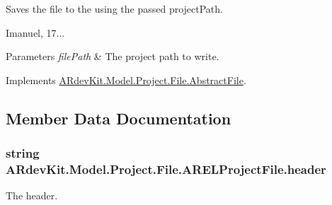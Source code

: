 Saves the file to the using the passed project\-Path. 

Imanuel, 17... 


\begin{DoxyParams}{Parameters}
{\em file\-Path} & The project path to write. \\
\hline
\end{DoxyParams}


Implements \hyperlink{class_a_rdev_kit_1_1_model_1_1_project_1_1_file_1_1_abstract_file_ae49c3262c59642e8f519d0655bbbbbab}{A\-Rdev\-Kit.\-Model.\-Project.\-File.\-Abstract\-File}.



\subsection{Member Data Documentation}
\hypertarget{class_a_rdev_kit_1_1_model_1_1_project_1_1_file_1_1_a_r_e_l_project_file_aa23070e2b62c07d4c41a5555ab673326}{
\subsubsection[{header}]{\setlength{\rightskip}{0pt plus 5cm}string A\-Rdev\-Kit.\-Model.\-Project.\-File.\-A\-R\-E\-L\-Project\-File.\-header\hspace{0.3cm}{\ttfamily [protected]}}}\label{class_a_rdev_kit_1_1_model_1_1_project_1_1_file_1_1_a_r_e_l_project_file_aa23070e2b62c07d4c41a5555ab673326}


The header. 

